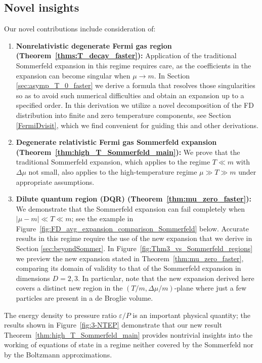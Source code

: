 \documentclass[sn-mathphys,Numbered]{sn-jnl}
\newcommand{\rf}[1]{Figure~{\ref{#1}}}
\newcommand*{\xred}{\color{black}}
\newcommand{\rTh}[1]{Theorem~{\ref{#1}}}
\begin{document}
\subsection{Novel insights}\label{insights}

Our novel contributions include consideration of:
\begin{enumerate}
\item {\bf Nonrelativistic degenerate Fermi gas region (\rTh{thms:T_decay_faster}):} Application of the traditional Sommerfeld expansion in this regime requires care, as the coefficients in the expansion can become singular when $\mu\to m$. In Section \ref{sec:asymp_T_0_faster} we derive a formula that resolves those singularities so as to avoid such numerical difficulties and obtain an expansion up to a specified order. In this derivation we utilize a novel decomposition of the FD distribution into finite and zero temperature components, see Section \ref{FermiDvisit}, which we find convenient for guiding this and other derivations.
\item {\bf Degenerate relativistic Fermi gas Sommerfeld expansion (\rTh{thm:high_T_Sommerfeld_main}):} We prove that the traditional Sommerfeld expansion, which applies to the regime $T\ll m$ with $\Delta\mu$ not small, also applies to the high-temperature regime $\mu\gg T\gg m$ under appropriate assumptions.
\item {\bf Dilute quantum region (DQR) (\rTh{thm:mu_zero_faster}):} We demonstrate that the Sommerfeld expansion can fail completely when $|\mu-m|\ll T\ll m$; see the example in \rf{fig:FD_avg_expansion_comparison_Sommerfeld} below. Accurate results in this regime require the use of the new expansion that we derive in Section \ref{sec:beyondSommer}. In \rf{fig:Thm3_vs_Sommerfeld_regions} we preview the new expansion stated in \rTh{thm:mu_zero_faster}, comparing its domain of validity to that of the Sommerfeld expansion in dimensions $D=2,3$. In particular, note that the new expansion derived here covers a distinct new region in the $(T/m,\Delta\mu/m)$-plane where just a few particles are present in a de Broglie volume.
\end{enumerate}
{\xred
The energy density to pressure ratio $\varepsilon/P$ is an important physical quantity; the results shown in \rf{fig:3-NTEP} demonstrate that our new result \rTh{thm:high_T_Sommerfeld_main} provides nontrivial insights into the working of equations of state in a regime neither covered by the Sommerfeld nor by the Boltzmann approximations. }
\end{document}

